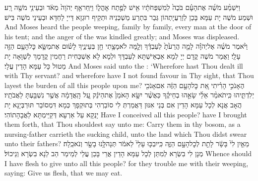 {וַיִּשְׁמַ֨ע מֹשֶׁ֜ה אֶת\maqqaf הָעָ֗ם בֹּכֶה֙ לְמִשְׁפְּחֹתָ֔יו אִ֖ישׁ לְפֶ֣תַח אׇהֳל֑וֹ וַיִּֽחַר\maqqaf אַ֤ף יְהֹוָה֙ מְאֹ֔ד וּבְעֵינֵ֥י מֹשֶׁ֖ה רָֽע׃}
{וּשְׁמַע מֹשֶׁה יָת עַמָּא בָּכַן לְזַרְעֲיָתְהוֹן גְּבַר בִּתְרַע מַשְׁכְּנֵיהּ וּתְקֵיף רוּגְזָא דַּייָ לַחְדָּא וּבְעֵינֵי מֹשֶׁה בִּישׁ׃}
{And Moses heard the people weeping, family by family, every man at the door of his tent; and the anger of the \lord\space was kindled greatly; and Moses was displeased.}{}
{וַיֹּ֨אמֶר מֹשֶׁ֜ה אֶל\maqqaf יְהֹוָ֗ה לָמָ֤ה הֲרֵעֹ֙תָ֙ לְעַבְדֶּ֔ךָ וְלָ֛מָּה לֹא\maqqaf מָצָ֥תִי חֵ֖ן בְּעֵינֶ֑יךָ לָשׂ֗וּם אֶת\maqqaf מַשָּׂ֛א כׇּל\maqqaf הָעָ֥ם הַזֶּ֖ה עָלָֽי׃}
{וַאֲמַר מֹשֶׁה קֳדָם יְיָ לְמָא אַבְאֵישְׁתָּא לְעַבְדָּךְ וּלְמָא לָא אַשְׁכַּחִית רַחֲמִין קֳדָמָךְ לְשַׁוָּאָה יָת מַטוּל כָּל עַמָּא הָדֵין עֲלָי׃}
{And Moses said unto the \lord: ‘Wherefore hast Thou dealt ill with Thy servant? and wherefore have I not found favour in Thy sight, that Thou layest the burden of all this people upon me?}{}
{הֶאָנֹכִ֣י הָרִ֗יתִי אֵ֚ת כׇּל\maqqaf הָעָ֣ם הַזֶּ֔ה אִם\maqqaf אָנֹכִ֖י יְלִדְתִּ֑יהוּ כִּֽי\maqqaf תֹאמַ֨ר אֵלַ֜י שָׂאֵ֣הוּ בְחֵיקֶ֗ךָ כַּאֲשֶׁ֨ר יִשָּׂ֤א הָאֹמֵן֙ אֶת\maqqaf הַיֹּנֵ֔ק עַ֚ל הָֽאֲדָמָ֔ה אֲשֶׁ֥ר נִשְׁבַּ֖עְתָּ לַאֲבֹתָֽיו׃}
{הֲאָב אֲנָא לְכָל עַמָּא הָדֵין אִם בְּנַי אִנּוּן דַּאֲמַרְתְּ לִי סוֹבַרְהִי בְּתוּקְפָךְ כְּמָא דִּמְסוֹבַר תּוּרְבְּיָנָא יָת יָנְקָא עַל אַרְעָא דְּקַיֵּימְתָּא לַאֲבָהָתוֹהִי׃}
{Have I conceived all this people? have I brought them forth, that Thou shouldest say unto me: Carry them in thy bosom, as a nursing-father carrieth the sucking child, unto the land which Thou didst swear unto their fathers?}{}
{מֵאַ֤יִן לִי֙ בָּשָׂ֔ר לָתֵ֖ת לְכׇל\maqqaf הָעָ֣ם הַזֶּ֑ה כִּֽי\maqqaf יִבְכּ֤וּ עָלַי֙ לֵאמֹ֔ר תְּנָה\maqqaf לָּ֥נוּ בָשָׂ֖ר וְנֹאכֵֽלָה׃}
{מְנָן לִי בִשְׂרָא לְמִתַּן לְכָל עַמָּא הָדֵין אֲרֵי בָּכַן עֲלַי לְמֵימַר הַב לַנָא בִשְׂרָא וְנֵיכוֹל׃}
{Whence should I have flesh to give unto all this people? for they trouble me with their weeping, saying: Give us flesh, that we may eat.}{}
